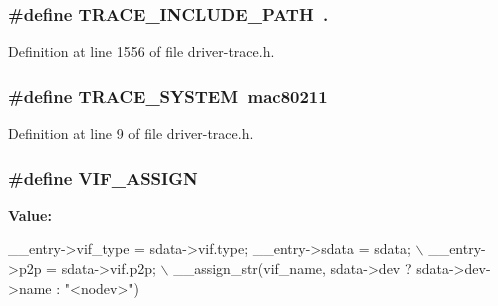 \hypertarget{driver-trace_8h_ac6a9ac061dda1a2beb782b3c9b44e77a}{
\subsubsection[{T\-R\-A\-C\-E\-\_\-\-I\-N\-C\-L\-U\-D\-E\-\_\-\-P\-A\-T\-H}]{\setlength{\rightskip}{0pt plus 5cm}\#define T\-R\-A\-C\-E\-\_\-\-I\-N\-C\-L\-U\-D\-E\-\_\-\-P\-A\-T\-H~.}}\label{driver-trace_8h_ac6a9ac061dda1a2beb782b3c9b44e77a}


Definition at line 1556 of file driver-\/trace.\-h.

\hypertarget{driver-trace_8h_a975ccf160f8e752c8162e389690b0961}{
\subsubsection[{T\-R\-A\-C\-E\-\_\-\-S\-Y\-S\-T\-E\-M}]{\setlength{\rightskip}{0pt plus 5cm}\#define T\-R\-A\-C\-E\-\_\-\-S\-Y\-S\-T\-E\-M~mac80211}}\label{driver-trace_8h_a975ccf160f8e752c8162e389690b0961}


Definition at line 9 of file driver-\/trace.\-h.

\hypertarget{driver-trace_8h_af5ede80f04ffcb3f644f68837b1d252c}{
\subsubsection[{V\-I\-F\-\_\-\-A\-S\-S\-I\-G\-N}]{\setlength{\rightskip}{0pt plus 5cm}\#define V\-I\-F\-\_\-\-A\-S\-S\-I\-G\-N}}\label{driver-trace_8h_af5ede80f04ffcb3f644f68837b1d252c}
{\bfseries Value\-:}
\begin{DoxyCode}
\_\_entry->vif\_type = sdata->vif.type; \_\_entry->sdata = sdata;    \(\backslash\)
            \_\_entry->p2p = sdata->vif.p2p;                  \(\backslash\)
            \_\_assign\_str(vif\_name, sdata->dev ? sdata->dev->name : \textcolor{stringliteral}{"<nodev>"})
\end{DoxyCode}


